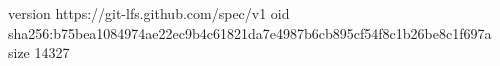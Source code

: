 version https://git-lfs.github.com/spec/v1
oid sha256:b75bea1084974ae22ec9b4c61821da7e4987b6cb895cf54f8c1b26be8c1f697a
size 14327
